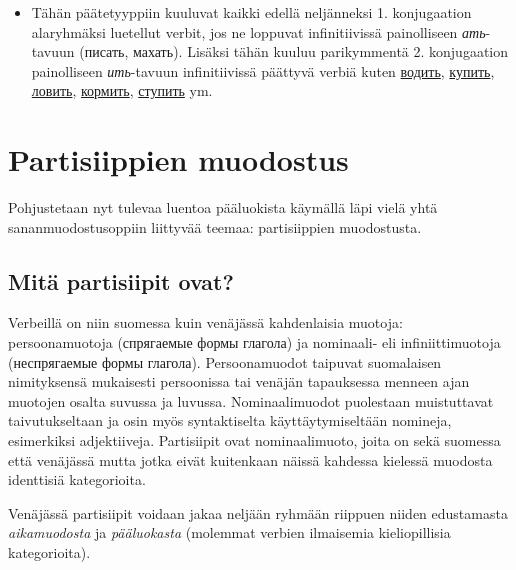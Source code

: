 \documentclass[]{scrreprt}
\providecommand{\tightlist}{%
  \setlength{\itemsep}{0pt}\setlength{\parskip}{0pt}}
\begin{document}
\begin{enumerate}
  \begin{itemize}
  \tightlist
  \item
    Tähän päätetyyppiin kuuluvat kaikki edellä neljänneksi 1.
    konjugaation alaryhmäksi luetellut verbit, jos ne loppuvat
    infinitiivissä painolliseen \emph{ать}-tavuun (писать, махать).
    Lisäksi tähän kuuluu parikymmentä 2. konjugaation painolliseen
    \emph{ить}-tavuun infinitiivissä päättyvä verbiä kuten
    \href{http://ru.wiktionary.org/wiki/\%D0\%B2\%D0\%BE\%D0\%B4\%D0\%B8\%D1\%82\%D1\%8C}{водить},
    \href{http://ru.wiktionary.org/wiki/\%D0\%BA\%D1\%83\%D0\%BF\%D0\%B8\%D1\%82\%D1\%8C}{купить},
    \href{http://ru.wiktionary.org/wiki/\%D0\%BB\%D0\%BE\%D0\%B2\%D0\%B8\%D1\%82\%D1\%8C}{ловить},
    \href{http://ru.wiktionary.org/wiki/\%D0\%BA\%D0\%BE\%D1\%80\%D0\%BC\%D0\%B8\%D1\%82\%D1\%8C}{кормить},
    \href{http://ru.wiktionary.org/wiki/\%D1\%81\%D1\%82\%D1\%83\%D0\%BF\%D0\%B8\%D1\%82\%D1\%8C}{ступить}
    ym.
  \end{itemize}
\end{enumerate}

\section{Partisiippien muodostus}\label{partisiippien-muodostus}

Pohjustetaan nyt tulevaa luentoa pääluokista käymällä läpi vielä yhtä
sananmuodostusoppiin liittyvää teemaa: partisiippien muodostusta.

\subsection{Mitä partisiipit ovat?}\label{mituxe4-partisiipit-ovat}

Verbeillä on niin suomessa kuin venäjässä kahdenlaisia muotoja:
persoonamuotoja (спрягаемые формы глагола) ja nominaali- eli
infiniittimuotoja (неспрягаемые формы глагола). Persoonamuodot taipuvat
suomalaisen nimityksensä mukaisesti persoonissa tai venäjän tapauksessa
menneen ajan muotojen osalta suvussa ja luvussa. Nominaalimuodot
puolestaan muistuttavat taivutukseltaan ja osin myös syntaktiselta
käyttäytymiseltään nomineja, esimerkiksi adjektiiveja. Partisiipit ovat
nominaalimuoto, joita on sekä suomessa että venäjässä mutta jotka eivät
kuitenkaan näissä kahdessa kielessä muodosta identtisiä kategorioita.

Venäjässä partisiipit voidaan jakaa neljään ryhmään riippuen niiden
edustamasta \emph{aikamuodosta} ja \emph{pääluokasta} (molemmat verbien
ilmaisemia kieliopillisia kategorioita).
\end{document}

